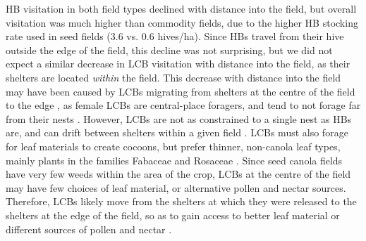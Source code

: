 \documentclass[12pt]{article} %
\begin{document}
HB visitation in both field types declined with distance into the field, but overall visitation was much higher than commodity fields, due to the higher HB stocking rate used in seed fields (3.6 vs. 0.6 hives/ha).
Since HBs travel from their hive outside the edge of the field, this decline was not surprising, but we did not expect a similar decrease in LCB visitation with distance into the field, as their shelters are located \textit{within} the field.
This decrease with distance into the field may have been caused by LCBs migrating from shelters at the centre of the field to the edge \citep{goerzen1995}, as female LCBs are central-place foragers, and tend to not forage far from their nests \citep{peterson2005,pitts2011, brunet2019}.
However, LCBs are not as constrained to a single nest as HBs are, and can drift between shelters within a given field \citep{goerzen1995, pittsSinger2013}.
LCBs must also forage for leaf materials to create cocoons, but prefer thinner, non-canola leaf types, mainly plants in the families Fabaceae and Rosaceae \citep{sinu2018}.
Since seed canola fields have very few weeds within the area of the crop, LCBs at the centre of the field may have few choices of leaf material, or alternative pollen and nectar sources.
Therefore, LCBs likely move from the shelters at which they were released to the shelters at the edge of the field, so as to gain access to better leaf material or different sources of pollen and nectar \citep{horne1995, horne1995b}.
\end{document}
